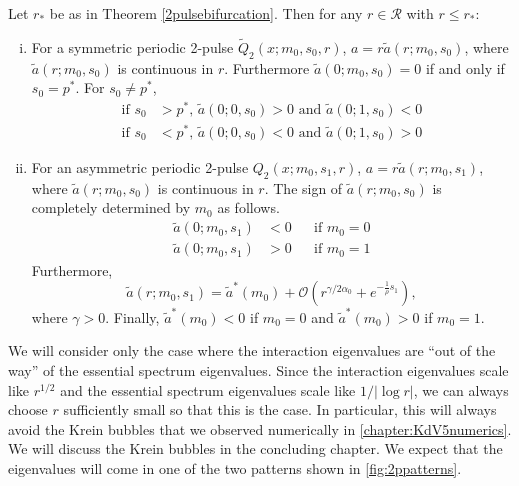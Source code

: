 \documentclass[thesis.tex]{subfiles}
\begin{document}
\begin{lemma}\label{lemma:chara}
Let $r_*$ be as in Theorem \ref{2pulsebifurcation}. Then for any $r \in \mathcal{R}$ with $r \leq r_*$:
\begin{enumerate}[(i)]
	\item For a symmetric periodic 2-pulse $\tilde{Q}_2(x; m_0, s_0, r)$, $a = r \tilde{a}(r; m_0, s_0)$, where $\tilde{a}(r; m_0, s_0)$ is continuous in $r$. Furthermore $\tilde{a}(0; m_0, s_0) = 0$ if and only if $s_0 = p^*$. For $s_0 \neq p^*$,
	\begin{equation}
	\begin{aligned}
	\text{if }s_0 &> p^*, \, \tilde{a}(0; 0, s_0) > 0 \text{ and } \tilde{a}(0; 1, s_0) < 0 \\
	\text{if }s_0 &< p^*, \, \tilde{a}(0; 0, s_0) < 0 \text{ and } \tilde{a}(0; 1, s_0) > 0 
	\end{aligned}
	\end{equation}

	\item For an asymmetric periodic 2-pulse $Q_2(x; m_0, s_1, r)$, $a = r \tilde{a}(r; m_0, s_1)$, where $\tilde{a}(r; m_0, s_0)$ is continuous in $r$. The sign of $\tilde{a}(r; m_0, s_0)$ is completely determined by $m_0$ as follows.
	\begin{equation} 
	\begin{aligned}
	\tilde{a}(0; m_0, s_1) &< 0 && \text{if }m_0 = 0 \\
	\tilde{a}(0; m_0, s_1) &> 0 && \text{if }m_0 = 1
	\end{aligned}
	\end{equation}
	Furthermore,
	\begin{equation}\label{tildeas1limit}
	\tilde{a}(r; m_0, s_1) = \tilde{a}^*(m_0) + \mathcal{O}\left(r^{\gamma/2\alpha_0} + e^{-\frac{1}{\rho}s_1} \right),
	\end{equation}
	where $\gamma > 0$. Finally, $\tilde{a}^*(m_0) < 0$ if $m_0 = 0$ and $\tilde{a}^*(m_0) > 0$ if $m_0 = 1$.
\end{enumerate}	
\end{lemma}

We will consider only the case where the interaction eigenvalues are ``out of the way'' of the essential spectrum eigenvalues. Since the interaction eigenvalues scale like $r^{1/2}$ and the essential spectrum eigenvalues scale like $1/|\log r|$, we can always choose $r$ sufficiently small so that this is the case. In particular, this will always avoid the Krein bubbles that we observed numerically in \cref{chapter:KdV5numerics}. We will discuss the Krein bubbles in the concluding chapter. We expect that the eigenvalues will come in one of the two patterns shown in \cref{fig:2ppatterns}.
\end{document}

